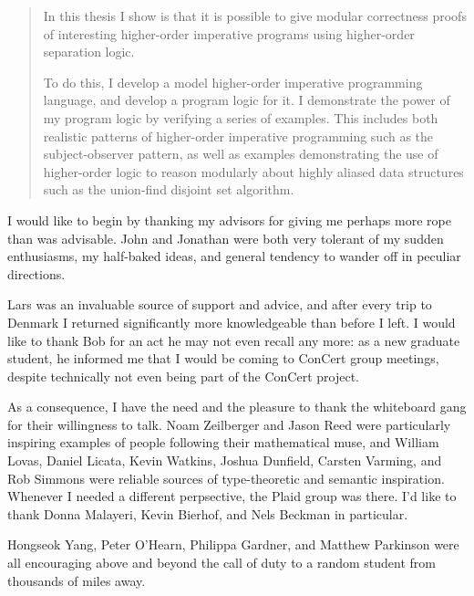 \documentclass[12pt]{cmuthesis}
\begin{document}

\begin{abstract}
In this thesis I show is that it is possible to give modular
correctness proofs of interesting higher-order imperative programs
using higher-order separation logic.

To do this, I develop a model higher-order imperative programming
language, and develop a program logic for it. I demonstrate the power
of my program logic by verifying a series of examples. This includes
both realistic patterns of higher-order imperative programming such as
the subject-observer pattern, as well as examples demonstrating the
use of higher-order logic to reason modularly about highly aliased
data structures such as the union-find disjoint set algorithm.
\end{abstract}

\begin{acknowledgments}
I would like to begin by thanking my advisors for giving me perhaps
more rope than was advisable. John and Jonathan were both very
tolerant of my sudden enthusiasms, my half-baked ideas, and general
tendency to wander off in peculiar directions. 

Lars was an invaluable source of support and advice, and after every
trip to Denmark I returned significantly more knowledgeable than
before I left. I would like to thank Bob for an act he may not even
recall any more: as a new graduate student, he informed me that I
would be coming to ConCert group meetings, despite technically not
even being part of the ConCert project.
 
As a consequence, I have the need and the pleasure to thank the
whiteboard gang for their willingness to talk. Noam Zeilberger and
Jason Reed were particularly inspiring examples of people following
their mathematical muse, and William Lovas, Daniel Licata, Kevin
Watkins, Joshua Dunfield, Carsten Varming, and Rob Simmons were
reliable sources of type-theoretic and semantic inspiration.
Whenever I needed a different perpsective, the Plaid group was
there. I'd like to thank Donna Malayeri, Kevin Bierhof, and Nels
Beckman in particular.

Hongseok Yang, Peter O'Hearn, Philippa Gardner, and Matthew Parkinson
were all encouraging above and beyond the call of duty to a random
student from thousands of miles away. 

\end{acknowledgments}
\end{document}
